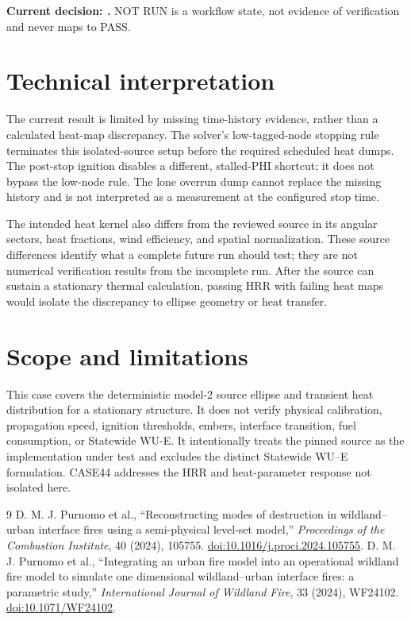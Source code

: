 \textbf{Current decision: \VerificationStatus.}  NOT RUN is a workflow state,
not evidence of verification and never maps to PASS.

\section{Technical interpretation}

The current result is limited by missing time-history evidence, rather than a
calculated heat-map discrepancy. The solver's low-tagged-node stopping rule
terminates this isolated-source setup before the required scheduled heat dumps.
The post-stop ignition disables a different, stalled-PHI shortcut; it does not
bypass the low-node rule. The lone overrun dump cannot replace the missing
history and is not interpreted as a measurement at the configured stop time.

The intended heat kernel also differs from the reviewed source in its angular
sectors, heat fractions, wind efficiency, and spatial normalization. These
source differences identify what a complete future run should test; they are
not numerical verification results from the incomplete run. After the source
can sustain a stationary thermal calculation, passing HRR with failing heat
maps would isolate the discrepancy to ellipse geometry or heat transfer.

\section{Scope and limitations}

This case covers the deterministic model-2 source ellipse and transient heat
distribution for a stationary structure.  It does not verify physical
calibration, propagation speed, ignition thresholds, embers, interface
transition, fuel consumption, or Statewide WU-E.  It intentionally treats
the pinned source as the implementation under test and excludes the distinct
Statewide WU--E formulation. CASE44 addresses the
HRR and heat-parameter response not isolated here.

\begin{thebibliography}{9}
 D. M. J. Purnomo et al., ``Reconstructing modes of destruction in wildland--urban interface fires using a semi-physical level-set model,'' \emph{Proceedings of the Combustion Institute}, 40 (2024), 105755. \href{https://doi.org/10.1016/j.proci.2024.105755}{doi:10.1016/j.proci.2024.105755}.
 D. M. J. Purnomo et al., ``Integrating an urban fire model into an operational wildland fire model to simulate one dimensional wildland--urban interface fires: a parametric study,'' \emph{International Journal of Wildland Fire}, 33 (2024), WF24102. \href{https://doi.org/10.1071/WF24102}{doi:10.1071/WF24102}.
\end{thebibliography}
